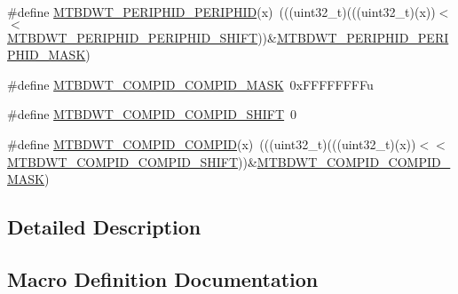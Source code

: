 \begin{DoxyCompactItemize}
\item 
\#define \hyperlink{group___m_t_b_d_w_t___register___masks_ga85beaf9ed0fda0463c678867e53e691d}{M\+T\+B\+D\+W\+T\+\_\+\+P\+E\+R\+I\+P\+H\+I\+D\+\_\+\+P\+E\+R\+I\+P\+H\+ID}(x)~(((uint32\+\_\+t)(((uint32\+\_\+t)(x))$<$$<$\hyperlink{group___m_t_b_d_w_t___register___masks_gaa9dfe45d3ebe7c1496f24e1b898ae6a5}{M\+T\+B\+D\+W\+T\+\_\+\+P\+E\+R\+I\+P\+H\+I\+D\+\_\+\+P\+E\+R\+I\+P\+H\+I\+D\+\_\+\+S\+H\+I\+FT}))\&\hyperlink{group___m_t_b_d_w_t___register___masks_gaa49f29267dcedd6db6aafce7b226182b}{M\+T\+B\+D\+W\+T\+\_\+\+P\+E\+R\+I\+P\+H\+I\+D\+\_\+\+P\+E\+R\+I\+P\+H\+I\+D\+\_\+\+M\+A\+SK})
\item 
\#define \hyperlink{group___m_t_b_d_w_t___register___masks_ga6b80c05493bf46a1572b3f25fda4764b}{M\+T\+B\+D\+W\+T\+\_\+\+C\+O\+M\+P\+I\+D\+\_\+\+C\+O\+M\+P\+I\+D\+\_\+\+M\+A\+SK}~0x\+F\+F\+F\+F\+F\+F\+F\+Fu
\item 
\#define \hyperlink{group___m_t_b_d_w_t___register___masks_ga26fe709d00d1433ca5a041dc307adfaa}{M\+T\+B\+D\+W\+T\+\_\+\+C\+O\+M\+P\+I\+D\+\_\+\+C\+O\+M\+P\+I\+D\+\_\+\+S\+H\+I\+FT}~0
\item 
\#define \hyperlink{group___m_t_b_d_w_t___register___masks_ga96051e4614a093622983f79511da83b1}{M\+T\+B\+D\+W\+T\+\_\+\+C\+O\+M\+P\+I\+D\+\_\+\+C\+O\+M\+P\+ID}(x)~(((uint32\+\_\+t)(((uint32\+\_\+t)(x))$<$$<$\hyperlink{group___m_t_b_d_w_t___register___masks_ga26fe709d00d1433ca5a041dc307adfaa}{M\+T\+B\+D\+W\+T\+\_\+\+C\+O\+M\+P\+I\+D\+\_\+\+C\+O\+M\+P\+I\+D\+\_\+\+S\+H\+I\+FT}))\&\hyperlink{group___m_t_b_d_w_t___register___masks_ga6b80c05493bf46a1572b3f25fda4764b}{M\+T\+B\+D\+W\+T\+\_\+\+C\+O\+M\+P\+I\+D\+\_\+\+C\+O\+M\+P\+I\+D\+\_\+\+M\+A\+SK})
\end{DoxyCompactItemize}


\subsection{Detailed Description}


\subsection{Macro Definition Documentation}
\mbox{\label{group___m_t_b_d_w_t___register___masks_ga1c3d552767450157531a7ef5e1d02731}} 
